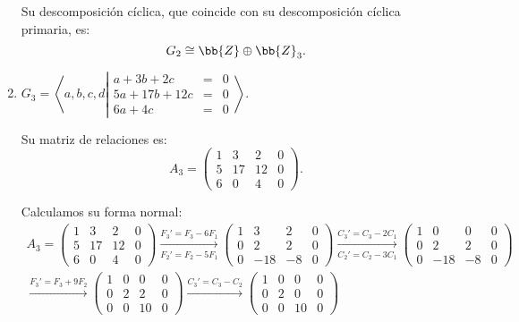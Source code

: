 \begin{ejercicio}
\begin{enumerate}
        Su descomposición cíclica, que coincide con su descomposición cíclica primaria, es:
        \begin{equation*}
            G_2 \cong \bb{Z} \oplus \bb{Z}_3.
        \end{equation*}
        \item $G_3 = \left\langle a, b, c, d \left|
            \begin{array}{rcl}
                a + 3b + 2c &=& 0 \\
                5a + 17b + 12c &=& 0 \\
                6a + 4c &=& 0
            \end{array}
        \right.\right\rangle$.

        Su matriz de relaciones es:
        \begin{equation*}
            A_3 = \begin{pmatrix}
                1 & 3 & 2 & 0\\
                5 & 17 & 12 & 0 \\
                6 & 0 & 4 & 0
            \end{pmatrix}.
        \end{equation*}

        Calculamos su forma normal:
        \begin{multline*}
            A_3 = \begin{pmatrix}
                1 & 3 & 2 & 0\\
                5 & 17 & 12 & 0 \\
                6 & 0 & 4 & 0
            \end{pmatrix}
            \xrightarrow[F_2' = F_2-5F_1]{F_3' = F_3-6F_1}
            \begin{pmatrix}
                1 & 3 & 2 & 0\\
                0 & 2 & 2 & 0 \\
                0 & -18 & -8 & 0
            \end{pmatrix}
            \xrightarrow[C_2' = C_2-3C_1]{C_3' = C_3-2C_1}
            \begin{pmatrix}
                1 & 0 & 0 & 0\\
                0 & 2 & 2 & 0 \\
                0 & -18 & -8 & 0
            \end{pmatrix}\\
            \xrightarrow{F_3' = F_3+9F_2}
            \begin{pmatrix}
                1 & 0 & 0 & 0\\
                0 & 2 & 2 & 0 \\
                0 & 0 & 10 & 0
            \end{pmatrix}
            \xrightarrow{C_3' = C_3-C_2}
            \begin{pmatrix}
                1 & 0 & 0 & 0\\
                0 & 2 & 0 & 0 \\
                0 & 0 & 10 & 0
            \end{pmatrix}
        \end{multline*}


\end{enumerate}
\end{ejercicio}

